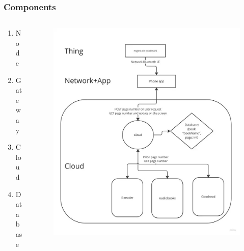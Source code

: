 \documentclass[compress, aspectratio=32]{beamer}
\begin{document}
\begin{frame}
    \frametitle{Components}
    \begin{columns}
        \begin{column}[]{0.4\textwidth}
            \begin{enumerate}
                \item Node
                \item Gateway
                \item Cloud
                \item Database
            \end{enumerate}            
        \end{column}
        \begin{column}{0.6\textwidth}
            \begin{figure}
                \includegraphics[height=0.8\textheight]{architecture.jpg}
            \end{figure}
        \end{column}
    \end{columns}
\end{frame}
\end{document}
